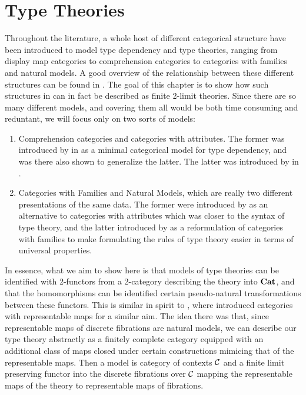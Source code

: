 \documentclass[../thesis.tex]{subfiles}
\begin{document}
\chapter{Type Theories}\label{ch:type theories}
Throughout the literature, a whole host of different categorical structure have been introduced to model
type dependency and type theories, ranging from display map categories to comprehension categories to
categories with families and natural models. A good overview of the relationship between these different
structures can be found in \cite{ahrens2024}. The goal of this chapter is to show how such structures in
can in fact be described as finite 2-limit theories. Since there are so many different models, and covering
them all would be both time consuming and reduntant, we will focus only on two sorts of models:
\begin{enumerate}
  \item Comprehension categories and categories with attributes. The former was introduced by \citeauthor{jacobs1993}
    in \cite{jacobs1993} as a minimal categorical model for type dependency, and was there also shown to generalize
    the latter. The latter was introduced by \citeauthor{cartmell1984} in \cite{cartmell1984}.
  \item Categories with Families and Natural Models, which are really two different presentations of the same data.
    The former were introduced by \citeauthor{dybjer1996} as an alternative to categories with attributes which was
    closer to the syntax of type theory, and the latter introduced by \citeauthor{awodey2017} as a reformulation of
    categories with families to make formulating the rules of type theory easier in terms of universal properties.
\end{enumerate}

In essence, what we aim to show here is that models of type theories can be identified with 2-functors from a
2-category describing the theory into ${\mathbf{Cat}}$, and that the homomorphisms can be identified certain pseudo-natural
transformations between these functors. This is similar in spirit to \cite{uemura2023}, where \citeauthor{uemura2023}
introduced categories with representable maps for a similar aim. The idea there was that, since representable maps of
discrete fibrations are natural models, we can describe our type theory abstractly as a finitely complete
category equipped with an additional class of maps closed under certain constructions mimicing that of
the representable maps. Then a model is category of contexts ${\mathcal{C}}$ and a finite limit preserving functor
into the discrete fibrations over ${\mathcal{C}}$ mapping the representable maps of the theory to representable
maps of fibrations. 
\end{document}
